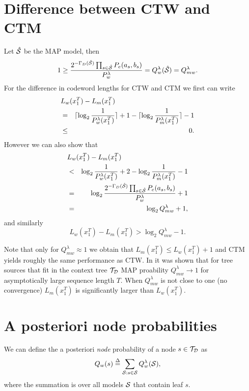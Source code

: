 \documentclass[10pt,conference]{IEEEtran}
\newcommand{\xT}{x^{T}_{1}}
\newcommand{\cS}{{\cal{S}}}
\newcommand{\hcS}{{\hat{\cal{S}}}}
\newcommand{\cTD}{{\cal{T}_{D}}}
\newcommand{\define}{\stackrel{\Delta}{=}}
\newcommand{\GD}{{\Gamma_{D}}}
\begin{document}
\section{Difference between CTW and CTM}
Let $\hcS$ be the MAP model, then
\begin{equation}
1 \geq \frac{2^{-\GD(\hcS)} \prod_{s\in\hcS} P_e( a_s,b_s) }{ P_{w}^{\lambda} }
= Q_{w}^{\lambda}(\hcS) = Q^{\lambda}_{mw}.
\end{equation}
For the difference in codeword lengths for CTW and CTM we first can write
\begin{eqnarray}
\lefteqn{L_w(\xT)-L_m(\xT)} \nonumber \\
&= & \lceil \log_2\frac{1}{P^{\lambda}_w(\xT)}\rceil + 1 - \lceil\log_2\frac{1}{P_m^{\lambda}(\xT)}\rceil -1 \nonumber \\
&\leq& 0.
\end{eqnarray}
However we can also show that
\begin{eqnarray}
\lefteqn{L_w(\xT)-L_m(\xT)} \nonumber \\
&< & \log_2\frac{1}{P^{\lambda}_w(\xT)} + 2 - \log_2\frac{1}{P^{\lambda}_m(\xT)} - 1 \nonumber \\
&=& \log_2\frac{2^{-\GD(\hcS)} \prod_{s\in\hcS} P_e( a_s,b_s) }{ P_{w}^{\lambda} } +1 \nonumber \\
&=& \log_2 Q_{mw}^{\lambda} + 1,
\end{eqnarray}
and similarly
\begin{equation}
L_w(\xT)-L_m(\xT) > \log_2 Q_{mw}^{\lambda} - 1.
\end{equation}

Note that only for $Q_{mw}^{\lambda} \approx 1$ we obtain that $L_m(\xT) \leq L_w(\xT) + 1$ and CTM yields roughly the same performance as CTW.
In \cite{WilShtTja00} it was shown that for tree sources that fit in the context tree $\cTD$ MAP proability $Q_{mw}^{\lambda} \rightarrow 1$ for asymptotically large sequence length $T$.
When $Q_{mw}^{\lambda}$ is not close to one (no convergence) $L_m(\xT)$ is significantly larger than $L_w(\xT)$.

\section{A posteriori node probabilities}
We can define the a posteriori {\em node} probability of a node $s \in \cTD$ as
\begin{equation}
Q_w(s) \define \sum_{\cS: s\in\cS} Q_{w}^{\lambda}(\cS),
\end{equation}
where the summation is over all models $\cS$ that contain leaf $s$.
\end{document}
